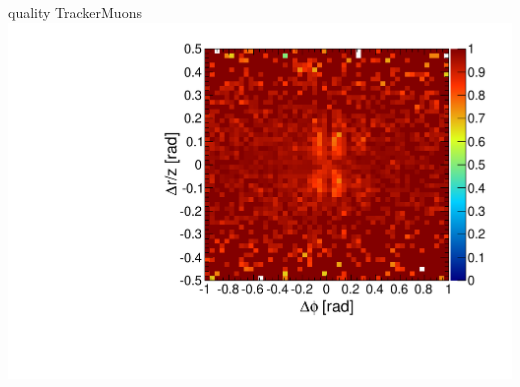\documentclass[compress]{beamer}
\begin{document}
\begin{frame}
\begin{columns}
\centering quality TrackerMuons
\includegraphics[width=\linewidth]{endcap_dphidr_TrackerMuon.pdf}
\end{columns}
\end{frame}
\end{document}
